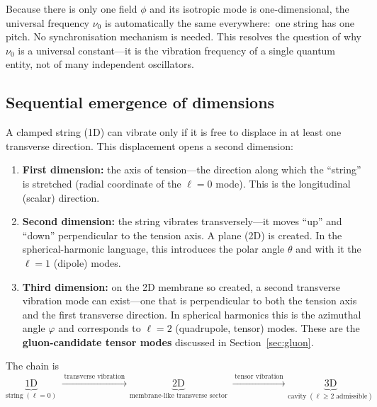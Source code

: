 \documentclass[11pt]{article}
\begin{document}
Because there is only one field $\phi$ and its
isotropic mode is one-dimensional, the universal
frequency $\nu_0$ is automatically the same
everywhere:\ one string has one pitch.  No
synchronisation mechanism is needed.  This
resolves the question of why $\nu_0$ is a
universal constant---it is the vibration
frequency of a single quantum entity, not of
many independent oscillators.

\subsection{Sequential emergence of
dimensions}
\label{sec:dim_emergence}

A clamped string (1D) can vibrate only if it is
free to displace in at least one transverse
direction.  This displacement opens a second
dimension:

\begin{enumerate}
\item \textbf{First dimension:}
  the axis of tension---the direction along
  which the ``string'' is stretched
  (radial coordinate of the $\ell = 0$ mode).
  This is the longitudinal (scalar) direction.

\item \textbf{Second dimension:}
  the string vibrates transversely---it moves
  ``up'' and ``down'' perpendicular to the
  tension axis.  A plane (2D) is created.
  In the spherical-harmonic language, this
  introduces the polar angle $\theta$ and with
  it the $\ell = 1$ (dipole) modes.

\item \textbf{Third dimension:}
  on the 2D membrane so created, a second
  transverse vibration mode can exist---one
  that is perpendicular to both the tension
  axis and the first transverse direction.
  In spherical harmonics this is the azimuthal
  angle $\varphi$ and corresponds to
  $\ell = 2$ (quadrupole, tensor) modes.
  These are the \textbf{gluon-candidate tensor
  modes} discussed in Section~\ref{sec:gluon}.
\end{enumerate}

The chain is
\begin{equation}\label{eq:dim_chain}
  \boxed{
  \underbrace{1\text{D}}_{\text{string}\;(\ell=0)}
  \;\xrightarrow{\;\text{transverse vibration}\;}
  \underbrace{2\text{D}}_{\text{membrane-like transverse sector}}
  \;\xrightarrow{\;\text{tensor vibration}\;}
  \underbrace{3\text{D}}_{\text{cavity}\;(\ell \geq 2\;\text{admissible})}
  }
\end{equation}
\end{document}
